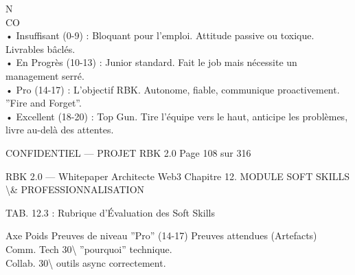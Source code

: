N\\
CO\\
• Insuffisant (0-9) : Bloquant pour l’emploi. Attitude passive ou toxique. Livrables bâclés.\\
\vspace{0.5em}
• En Progrès (10-13) : Junior standard. Fait le job mais nécessite un management serré.\\
\vspace{0.5em}
• Pro (14-17) : L’objectif RBK. Autonome, fiable, communique proactivement. ”Fire and Forget”.\\
\vspace{0.5em}
• Excellent (18-20) : Top Gun. Tire l’équipe vers le haut, anticipe les problèmes, livre au-delà des attentes.\\
\vspace{0.5em}
\vspace{0.5em}
\vspace{0.5em}
\vspace{0.5em}
\begin{confidential}CONFIDENTIEL — PROJET RBK 2.0                                 Page 108 sur 316\end{confidential}
RBK 2.0 — Whitepaper Architecte Web3                                                  Chapitre 12. MODULE SOFT SKILLS \textbackslash{}& PROFESSIONNALISATION\\
\vspace{0.5em}
\vspace{0.5em}
\begin{center}\begin{tabular}TAB. 12.3 : Rubrique d’Évaluation des Soft Skills\end{tabular}\end{center}
\vspace{0.5em}
\vspace{0.5em}
Axe        Poids Preuves de niveau ”Pro” (14-17)                                       Preuves attendues (Artefacts)\\
Comm. Tech 30\textbackslash{}%
”pourquoi” technique.\\
Collab.    30\textbackslash{}%
outils async correctement.\\
